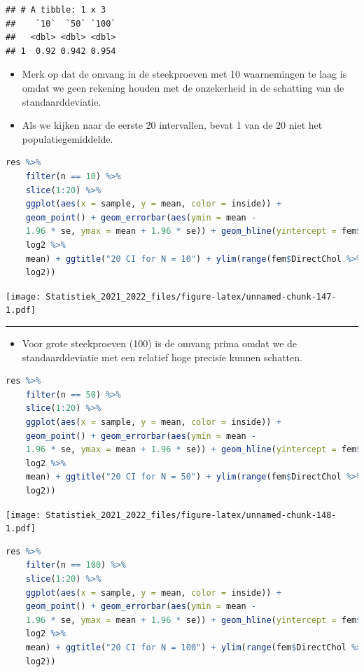 \documentclass[
  12pt,dutch,coursenotes]{book}
\providecommand{\tightlist}{%
  \setlength{\itemsep}{0pt}\setlength{\parskip}{0pt}}
\theoremstyle{definition}
\theoremstyle{definition}
\theoremstyle{definition}
\theoremstyle{definition}
\theoremstyle{remark}
\begin{document}
\begin{lstlisting}
## # A tibble: 1 x 3
##    `10`  `50` `100`
##   <dbl> <dbl> <dbl>
## 1  0.92 0.942 0.954
\end{lstlisting}

\begin{itemize}
\item
  Merk op dat de omvang in de steekproeven met 10 waarnemingen te laag is omdat we geen rekening houden met de onzekerheid in de schatting van de standaarddeviatie.
\item
  Als we kijken naar de eerste 20 intervallen, bevat 1 van de 20 niet het populatiegemiddelde.
\end{itemize}

\begin{lstlisting}[language=R]
res %>%
    filter(n == 10) %>%
    slice(1:20) %>%
    ggplot(aes(x = sample, y = mean, color = inside)) +
    geom_point() + geom_errorbar(aes(ymin = mean -
    1.96 * se, ymax = mean + 1.96 * se)) + geom_hline(yintercept = fem$DirectChol %>%
    log2 %>%
    mean) + ggtitle("20 CI for N = 10") + ylim(range(fem$DirectChol %>%
    log2))
\end{lstlisting}

\texttt{[image: Statistiek\_2021\_2022\_files/figure-latex/unnamed-chunk-147-1.pdf]}

\begin{center}\rule{0.5\linewidth}{0.5pt}\end{center}

\begin{itemize}
\tightlist
\item
  Voor grote steekproeven (100) is de omvang prima omdat we de standaarddeviatie met een relatief hoge precisie kunnen schatten.
\end{itemize}

\begin{lstlisting}[language=R]
res %>%
    filter(n == 50) %>%
    slice(1:20) %>%
    ggplot(aes(x = sample, y = mean, color = inside)) +
    geom_point() + geom_errorbar(aes(ymin = mean -
    1.96 * se, ymax = mean + 1.96 * se)) + geom_hline(yintercept = fem$DirectChol %>%
    log2 %>%
    mean) + ggtitle("20 CI for N = 50") + ylim(range(fem$DirectChol %>%
    log2))
\end{lstlisting}

\texttt{[image: Statistiek\_2021\_2022\_files/figure-latex/unnamed-chunk-148-1.pdf]}

\begin{lstlisting}[language=R]
res %>%
    filter(n == 100) %>%
    slice(1:20) %>%
    ggplot(aes(x = sample, y = mean, color = inside)) +
    geom_point() + geom_errorbar(aes(ymin = mean -
    1.96 * se, ymax = mean + 1.96 * se)) + geom_hline(yintercept = fem$DirectChol %>%
    log2 %>%
    mean) + ggtitle("20 CI for N = 100") + ylim(range(fem$DirectChol %>%
    log2))
\end{lstlisting}
\end{document}
